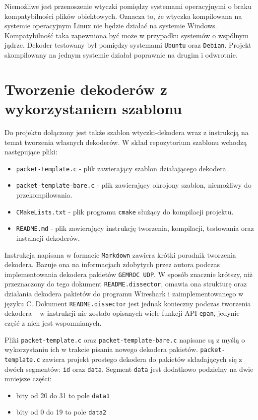 \documentclass[a4paper, 12pt, twoside, openright]{article}
\begin{document}
	Niemożliwe jest przenoszenie wtyczki pomiędzy systemami operacyjnymi o braku kompatybilności plików obiektowych.
	Oznacza to, że wtyczka kompilowana na systemie operacyjnym Linux nie będzie działać na systemie Windows.
	Kompatybilność taka zapewniona być może w przypadku systemów o wspólnym jądrze. Dekoder testowany był
	pomiędzy systemami \texttt{Ubuntu} oraz \texttt{Debian}. Projekt skompilowany na jednym systemie działał poprawnie
	na drugim i odwrotnie.

\newpage
\section{Tworzenie dekoderów z wykorzystaniem szablonu}

	Do projektu dołączony jest także szablon wtyczki-dekodera wraz z instrukcją na temat tworzenia własnych dekoderów.
	W skład repozytorium szablonu wchodzą następujące pliki:
	\begin{itemize}
		\item \texttt{packet-template.c} - plik zawierający szablon działającego dekodera.
		\item \texttt{packet-template-bare.c} - plik zawierający okrojony szablon, niemożliwy do przekompilowania.
		\item \texttt{CMakeLists.txt} - plik programu \texttt{cmake} służący do kompilacji projektu.
		\item \texttt{README.md} - plik zawierający instrukcję tworzenia, kompilacji, testowania oraz instalacji dekoderów.
	\end{itemize}

	Instrukcja napisana w formacie \texttt{Markdown} zawiera krótki poradnik tworzenia dekodera. Bazuje ona na informacjach
	zdobytych przez autora podczas implementowania dekodera pakietów \texttt{GEMROC UDP}. W sposób znacznie krótszy,
	niż przeznaczony do tego dokument \texttt{README.dissector}, omawia ona strukturę oraz działania dekodera pakietów
	do programu Wireshark i zaimplementowanego w języku C. Dokument \texttt{README.dissector} jest jednak konieczny podczas
	tworzenia dekodera -- w instrukcji nie zostało opisanych wiele funkcji API \texttt{epan}, jedynie część z nich jest
	wspomnianych.

	Pliki \texttt{packet-template.c} oraz \texttt{packet-template-bare.c} napisane są z myślą o wykorzystaniu ich w trakcie
	pisania nowego dekodera pakietów. \texttt{packet-template.c} zawiera projekt prostego dekodera do pakietów składających
	się z dwóch segmentów: \texttt{id} oraz \texttt{data}. Segment \texttt{data} jest dodatkowo podzielny na dwie mniejsze
	części:
	\begin{itemize}
		\item bity od 20 do 31 to pole \texttt{data1}
		\item bity od 0 do 19 to pole \texttt{data2}
	\end{itemize}
\end{document}
